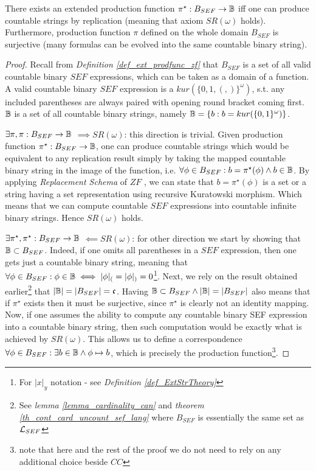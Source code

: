 \begin{theorem}\label{theorem_crt}
    There exists an extended production function $\pi^\star: B_{SEF} \to \mathbb{B}$ iff one can produce countable strings by replication (meaning that axiom $SR(\omega)$ holds). Furthermore, production function $\pi$ defined on the whole domain $B_{SEF}$ is surjective (many formulas can be evolved into the same countable binary string).
\end{theorem}
\begin{proof}
    Recall from \textit{Definition \ref{def_ext_prodfunc_zf}} that $B_{SEF}$ is a set of all valid countable binary $SEF$ expressions, which can be taken as a domain of a function. A valid countable binary $SEF$ expression is a $kur(\{0,1,(,)\}^\omega)$, s.t. any included parentheses are always paired with opening round bracket coming first. $\mathbb{B}$ is a set of all countable binary strings, namely $\mathbb{B} = \{b : b = kur(\{0,1\}^\omega)\}$.

    $\exists \pi, \pi: B_{SEF} \to \mathbb{B}$ $\implies SR(\omega)$: this direction is trivial. Given  production function $\pi^\star: B_{SEF} \to \mathbb{B}$, one can produce countable strings which would be equivalent to any replication result simply by taking the mapped countable binary string in the image of the function, i.e. $\forall \phi \in B_{SEF}:  b = \pi^\star(\phi) \land b \in \mathbb{B}$. By applying \textit{Replacement Schema} of $ZF$ \cite{jech2003set}, we can state that $b = \pi^\star(\phi)$ is a set or a string having a set representation using recursive Kuratowski morphism. Which means that we can compute countable $SEF$ expressions into countable infinite binary strings. Hence $SR(\omega)$ holds.
    
    $\exists \pi^\star, \pi^\star: B_{SEF} \to \mathbb{B}$ $\impliedby SR(\omega)$: for other direction we start by showing that $\mathbb{B} \subset B_{SEF}$. Indeed, if one omits all parentheses in a $SEF$ expression, then one gets just a countable binary string, meaning that $\forall \phi \in B_{SEF} : \phi \in \mathbb{B} \iff |\phi|_{(} = |\phi|_{)} = 0$\footnote{For $|x|_y$ notation - see \textit{Definition \ref{def_ExtStrTheory}}}. Next, we rely on the result obtained earlier\footnote{See \textit{lemma \ref{lemma_cardinality_can}} and \textit{theorem \ref{th_cont_card_uncount_sef_lang}} where $B_{SEF}$ is essentially the same set as $\mathcal{L}_{SEF}$} that $|\mathbb{B}| = |B_{SEF}|  = \mathfrak{c}$. Having $\mathbb{B} \subset B_{SEF} \land |\mathbb{B}| = |B_{SEF}|$ also means that if $\pi^\star$ exists then it must be surjective, since $\pi^\star$ is clearly not an identity mapping. Now, if one assumes the ability to compute any countable binary SEF expression into a countable binary string, then such computation would be exactly what is achieved by $SR(\omega)$. This allows us to define a correspondence $\forall \phi \in B_{SEF}: \exists b \in \mathbb{B} \land \phi \mapsto b$, which is precisely the production function\footnote{note that here and the rest of the proof we do not need to rely on any additional choice beside $CC$}. 

\end{proof}

